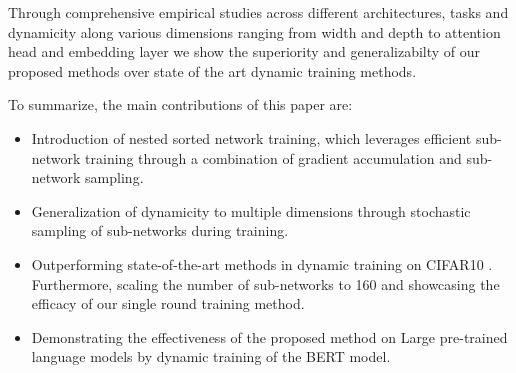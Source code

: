 \documentclass[letterpaper]{article} %
\begin{document}
Through comprehensive empirical studies across different architectures, tasks and dynamicity along various dimensions ranging from width and depth to attention head and embedding layer we show the superiority and generalizabilty of our proposed methods over state of the art dynamic training methods. 


To summarize, the main contributions of this paper are:
\begin{itemize}
\item Introduction of nested sorted network training, which leverages efficient sub-network training through a combination of gradient accumulation and sub-network sampling.
\item Generalization of dynamicity to multiple dimensions through stochastic sampling of sub-networks during training.
\item Outperforming state-of-the-art methods in dynamic training on CIFAR10 \cite{krizhevsky2009learning}. Furthermore, scaling the number of sub-networks to 160 and showcasing the efficacy of our single round training method. 
\item Demonstrating the effectiveness of the proposed method on Large pre-trained language models by dynamic training of the BERT model. %


\end{itemize}



\end{document}
